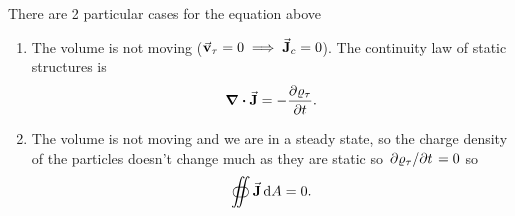 \documentclass[a4paper,12pt]{article}
\begin{document}
There are 2 particular cases for the equation above
\begin{enumerate}
    \item The volume is not moving ($\va{v}_\tau=0 \implies \va{J}_c=0$). The continuity law of static structures is
        \begin{equation}
            \div{\va{J}}=-\pdv{\varrho_\tau}{t} 
        .\end{equation} 
        \item The volume is not moving and we are in a steady state, so the charge density of the particles doesn't change much as they are static so $\pdv*{\varrho_\tau}{t}=0 $ so
            \begin{equation}
            \oiint \va{J}\dd {A}=0
            .\end{equation} 
\end{enumerate}
\end{document}
